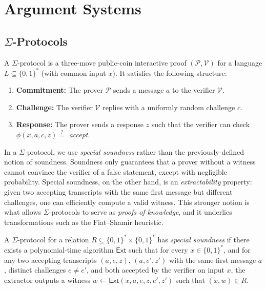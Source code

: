 \section{Argument Systems}

\subsection{$\Sigma$-Protocols}

\begin{definition}
  A $\Sigma$-protocol is a three-move public-coin interactive proof $(\mathcal{P},\mathcal{V})$ for a language $L \subseteq \{0,1\}^*$ (with common input $x$). It satisfies the following structure:

  \begin{enumerate}
    \item \textbf{Commitment:} The prover $\mathcal{P}$ sends a message $a$ to the verifier $\mathcal{V}$.
    \item \textbf{Challenge:} The verifier $\mathcal{V}$ replies with a uniformly random challenge $c$.
    \item \textbf{Response:} The prover sends a response $z$ such that the verifier can check $\phi(x, a, c, z) \stackrel{?}{=}$ \emph{accept}.
  \end{enumerate}
\end{definition}

\begin{remark}
  In a $\Sigma$-protocol, we use \emph{special soundness} rather than the previously-defined notion of soundness. 
  Soundness only guarantees that a prover without a witness cannot convince the 
  verifier of a false statement, except with negligible probability. Special soundness, 
  on the other hand, is an \emph{extractability} property: given two accepting transcripts 
  with the same first message but different challenges, one can efficiently compute a valid 
  witness. This stronger notion is what allows $\Sigma$-protocols to serve as 
  \emph{proofs of knowledge}, and it underlies transformations such as the Fiat--Shamir 
  heuristic.
\end{remark}

\begin{definition}
  A $\Sigma$-protocol for a relation $R \subseteq \{0,1\}^* \times \{0,1\}^*$ has 
  \emph{special soundness} if there exists a polynomial-time algorithm 
  $\mathsf{Ext}$ such that for every $x \in \{0,1\}^*$, and for any two 
  accepting transcripts $(a,e,z)$, $(a,e',z')$ with the same first message $a$, distinct challenges $e \neq e'$, and both accepted 
  by the verifier on input $x$, the extractor outputs a witness
  $w \gets \mathsf{Ext}(x,a,e,z,e',z')$ such that $(x,w) \in R$.
\end{definition}

